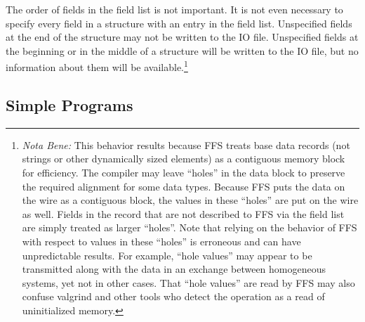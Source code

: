 The order of fields in the field list is not important.  It is not even
necessary to specify every field in a structure with an entry in the field
list. Unspecified fields at the end of the structure may not be written to
the IO file.  Unspecified fields at the beginning or in the middle of a
structure will be written to the IO file, but no information about them will
be available.\footnote{{\it Nota Bene:} This behavior results because FFS
  treats base data records (not strings or other dynamically sized elements)
  as a contiguous memory block for efficiency.  The compiler may leave
  ``holes'' in the data block to preserve the required alignment for some
  data types.  Because FFS puts the data on the wire as a contiguous block,
  the values in these ``holes'' are put on the wire as well.  Fields in the
  record that are not described to FFS via the field list are simply treated
  as larger ``holes''.  Note that relying on the behavior of FFS with
  respect to values in these ``holes'' is erroneous and can have
  unpredictable results.  For example, ``hole values'' may appear to be
  transmitted along with the data in an exchange between homogeneous
  systems, yet not in other cases.  That ``hole values'' are read by FFS may
  also confuse valgrind and other tools who detect the operation as a read
  of uninitialized memory.}

\subsection{Simple Programs}

